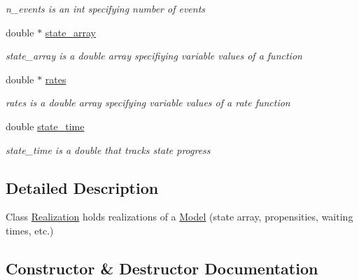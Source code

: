 \begin{DoxyCompactItemize}
\begin{DoxyCompactList}\small\item\em n\+\_\+events is an int specifying number of events \end{DoxyCompactList}\item 
\mbox{\label{class_realization_a126f89978f0407873473222171333ee1}} 
double $\ast$ \hyperlink{class_realization_a126f89978f0407873473222171333ee1}{state\+\_\+array}
\begin{DoxyCompactList}\small\item\em state\+\_\+array is a double array specifiying variable values of a function \end{DoxyCompactList}\item 
\mbox{\label{class_realization_a9c52d8c6aa0ad99dbbec1e98302db7d8}} 
double $\ast$ \hyperlink{class_realization_a9c52d8c6aa0ad99dbbec1e98302db7d8}{rates}
\begin{DoxyCompactList}\small\item\em rates is a double array specifying variable values of a rate function \end{DoxyCompactList}\item 
\mbox{\label{class_realization_a7c4def45c4833072317517b71e723793}} 
double \hyperlink{class_realization_a7c4def45c4833072317517b71e723793}{state\+\_\+time}
\begin{DoxyCompactList}\small\item\em state\+\_\+time is a double that tracks state progress \end{DoxyCompactList}\end{DoxyCompactItemize}


\subsection{Detailed Description}
Class \hyperlink{class_realization}{Realization} holds realizations of a \hyperlink{class_model}{Model} (state array, propensities, waiting times, etc.) 

\subsection{Constructor \& Destructor Documentation}
\mbox{\label{class_realization_af4cfb6f2221bef9ba5ad09564796677f}} 
